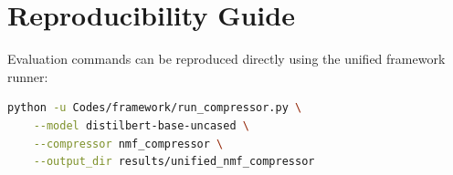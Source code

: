 \section{Reproducibility Guide}
Evaluation commands can be reproduced directly using the unified framework runner:
\begin{lstlisting}[language=bash]
python -u Codes/framework/run_compressor.py \
    --model distilbert-base-uncased \
    --compressor nmf_compressor \
    --output_dir results/unified_nmf_compressor
\end{lstlisting}
